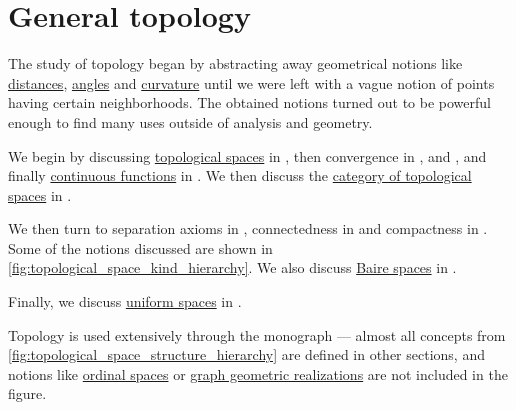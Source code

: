 \chapter{General topology}\label{ch:general_topology}

The study of topology began by abstracting away geometrical notions like \hyperref[def:metric_space]{distances}, \hyperref[def:angle]{angles} and \hyperref[def:regular_curve_curvature]{curvature} until we were left with a vague notion of points having certain neighborhoods. The obtained notions turned out to be powerful enough to find many uses outside of analysis and geometry.

We begin by discussing \hyperref[def:topological_space]{topological spaces} in , then convergence in ,  and , and finally \hyperref[def:global_continuity]{continuous functions} in . We then discuss the \hyperref[def:category_of_small_topological_spaces]{category of topological spaces} in .

We then turn to separation axioms in , connectedness in  and compactness in . Some of the notions discussed are shown in \cref{fig:topological_space_kind_hierarchy}. We also discuss \hyperref[def:baire_space]{Baire spaces} in .

Finally, we discuss \hyperref[def:uniform_space]{uniform spaces} in .

Topology is used extensively through the monograph --- almost all concepts from \cref{fig:topological_space_structure_hierarchy} are defined in other sections, and notions like \hyperref[def:ordinal_space]{ordinal spaces} or \hyperref[def:graph_geometric_realization]{graph geometric realizations} are not included in the figure.


